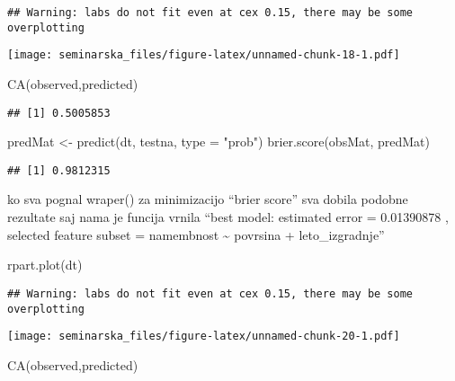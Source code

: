 \documentclass[
]{article}
\newenvironment{Shaded}{\begin{snugshade}}{\end{snugshade}}
\newcommand{\AttributeTok}[1]{\textcolor[rgb]{0.77,0.63,0.00}{#1}}
\newcommand{\FunctionTok}[1]{\textcolor[rgb]{0.00,0.00,0.00}{#1}}
\newcommand{\NormalTok}[1]{#1}
\newcommand{\OtherTok}[1]{\textcolor[rgb]{0.56,0.35,0.01}{#1}}
\newcommand{\StringTok}[1]{\textcolor[rgb]{0.31,0.60,0.02}{#1}}
\begin{document}
\begin{verbatim}
## Warning: labs do not fit even at cex 0.15, there may be some overplotting
\end{verbatim}

\texttt{[image: seminarska\_files/figure-latex/unnamed-chunk-18-1.pdf]}

\begin{Shaded}
\begin{Highlighting}[]
\FunctionTok{CA}\NormalTok{(observed,predicted)}
\end{Highlighting}
\end{Shaded}

\begin{verbatim}
## [1] 0.5005853
\end{verbatim}

\begin{Shaded}
\begin{Highlighting}[]
\NormalTok{predMat }\OtherTok{\textless{}{-}} \FunctionTok{predict}\NormalTok{(dt, testna, }\AttributeTok{type =} \StringTok{"prob"}\NormalTok{)}
\FunctionTok{brier.score}\NormalTok{(obsMat, predMat)}
\end{Highlighting}
\end{Shaded}

\begin{verbatim}
## [1] 0.9812315
\end{verbatim}

ko sva pognal wraper() za minimizacijo ``brier score'' sva dobila
podobne rezultate saj nama je funcija vrnila ``best model: estimated
error = 0.01390878 , selected feature subset = namembnost
\textasciitilde{} povrsina + leto\_izgradnje''

\begin{Shaded}
\begin{Highlighting}[]
\FunctionTok{rpart.plot}\NormalTok{(dt)}
\end{Highlighting}
\end{Shaded}

\begin{verbatim}
## Warning: labs do not fit even at cex 0.15, there may be some overplotting
\end{verbatim}

\texttt{[image: seminarska\_files/figure-latex/unnamed-chunk-20-1.pdf]}

\begin{Shaded}
\begin{Highlighting}[]
\FunctionTok{CA}\NormalTok{(observed,predicted)}
\end{Highlighting}
\end{Shaded}
\end{document}
